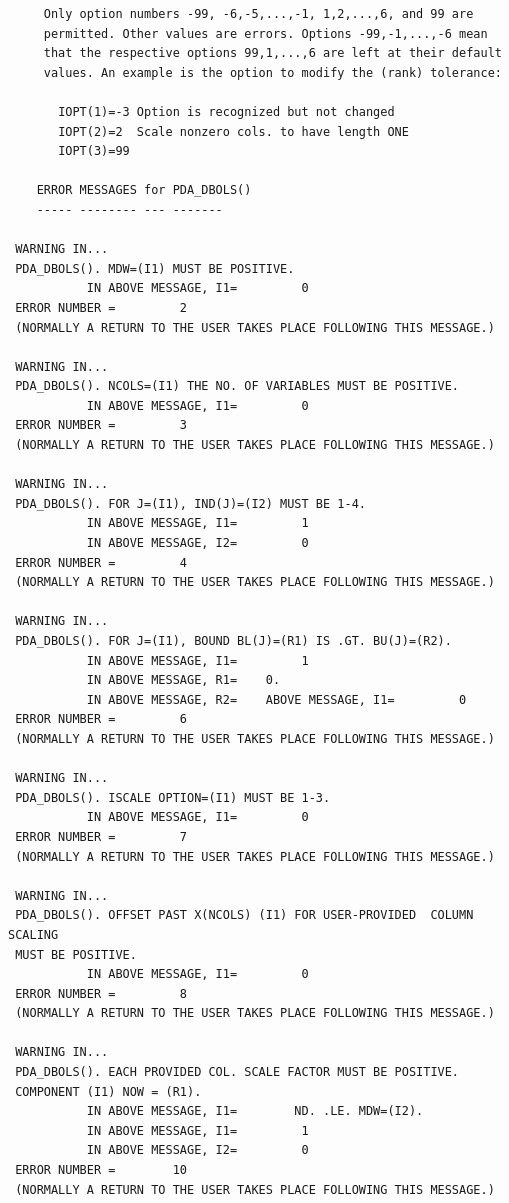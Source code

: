 \documentclass[11pt,twoside]{article}
\begin{document}
\begin{verbatim}
     Only option numbers -99, -6,-5,...,-1, 1,2,...,6, and 99 are
     permitted. Other values are errors. Options -99,-1,...,-6 mean
     that the respective options 99,1,...,6 are left at their default
     values. An example is the option to modify the (rank) tolerance:

       IOPT(1)=-3 Option is recognized but not changed
       IOPT(2)=2  Scale nonzero cols. to have length ONE
       IOPT(3)=99

    ERROR MESSAGES for PDA_DBOLS()
    ----- -------- --- -------

 WARNING IN...
 PDA_DBOLS(). MDW=(I1) MUST BE POSITIVE.
           IN ABOVE MESSAGE, I1=         0
 ERROR NUMBER =         2
 (NORMALLY A RETURN TO THE USER TAKES PLACE FOLLOWING THIS MESSAGE.)

 WARNING IN...
 PDA_DBOLS(). NCOLS=(I1) THE NO. OF VARIABLES MUST BE POSITIVE.
           IN ABOVE MESSAGE, I1=         0
 ERROR NUMBER =         3
 (NORMALLY A RETURN TO THE USER TAKES PLACE FOLLOWING THIS MESSAGE.)

 WARNING IN...
 PDA_DBOLS(). FOR J=(I1), IND(J)=(I2) MUST BE 1-4.
           IN ABOVE MESSAGE, I1=         1
           IN ABOVE MESSAGE, I2=         0
 ERROR NUMBER =         4
 (NORMALLY A RETURN TO THE USER TAKES PLACE FOLLOWING THIS MESSAGE.)

 WARNING IN...
 PDA_DBOLS(). FOR J=(I1), BOUND BL(J)=(R1) IS .GT. BU(J)=(R2).
           IN ABOVE MESSAGE, I1=         1
           IN ABOVE MESSAGE, R1=    0.
           IN ABOVE MESSAGE, R2=    ABOVE MESSAGE, I1=         0
 ERROR NUMBER =         6
 (NORMALLY A RETURN TO THE USER TAKES PLACE FOLLOWING THIS MESSAGE.)

 WARNING IN...
 PDA_DBOLS(). ISCALE OPTION=(I1) MUST BE 1-3.
           IN ABOVE MESSAGE, I1=         0
 ERROR NUMBER =         7
 (NORMALLY A RETURN TO THE USER TAKES PLACE FOLLOWING THIS MESSAGE.)

 WARNING IN...
 PDA_DBOLS(). OFFSET PAST X(NCOLS) (I1) FOR USER-PROVIDED  COLUMN SCALING
 MUST BE POSITIVE.
           IN ABOVE MESSAGE, I1=         0
 ERROR NUMBER =         8
 (NORMALLY A RETURN TO THE USER TAKES PLACE FOLLOWING THIS MESSAGE.)

 WARNING IN...
 PDA_DBOLS(). EACH PROVIDED COL. SCALE FACTOR MUST BE POSITIVE.
 COMPONENT (I1) NOW = (R1).
           IN ABOVE MESSAGE, I1=        ND. .LE. MDW=(I2).
           IN ABOVE MESSAGE, I1=         1
           IN ABOVE MESSAGE, I2=         0
 ERROR NUMBER =        10
 (NORMALLY A RETURN TO THE USER TAKES PLACE FOLLOWING THIS MESSAGE.)


\end{verbatim}
\end{document}
